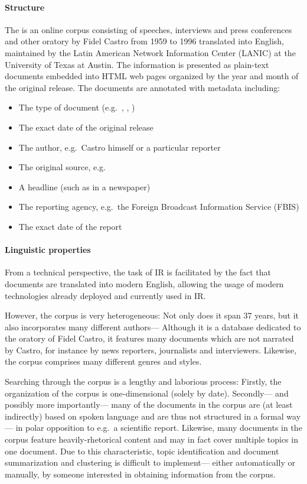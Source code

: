 \paragraph{Structure}
The  is an online corpus consisting of speeches, interviews and press conferences and other oratory by Fidel Castro from 1959 to 1996 translated into English, maintained by the Latin American Network Information Center (LANIC) at the University of Texas at Austin. The information is presented as plain-text documents embedded into HTML web pages organized by the year and month of the original release. The documents are annotated with metadata including:

\begin{itemize}
\item The type of document (e.g.\ , , )
\item The exact date of the original release
\item The author, e.g.\ Castro himself or a particular reporter
\item The original source, e.g.\ 
\item A headline (such as in a newspaper)
\item The reporting agency, e.g.\ the Foreign Broadcast Information Service (FBIS)
\item The exact date of the report
\end{itemize}

\paragraph{Linguistic properties}
From a technical perspective, the task of IR is facilitated by the fact that documents are translated into modern English, allowing the usage of modern technologies already deployed and currently used in IR.

However, the corpus is very heterogeneous: Not only does it span 37 years, but it also incorporates many different authors--- Although it is a database dedicated to the oratory of Fidel Castro, it features many documents which are not narrated by Castro, for instance by news reporters, journalists and interviewers. Likewise, the corpus comprises many different genres and styles.

Searching through the corpus is a lengthy and laborious process: Firstly, the organization of the corpus is one-dimensional (solely by date). Secondly--- and possibly more importantly--- many of the documents in the corpus are (at least indirectly) based on spoken language and are thus not structured in a formal way--- in polar opposition to e.g.\ a scientific report. Likewise, many documents in the corpus feature heavily-rhetorical content and may in fact cover multiple topics in one document. Due to this characteristic, topic identification and document summarization and clustering is difficult to implement--- either automatically or manually, by someone interested in obtaining information from the corpus.